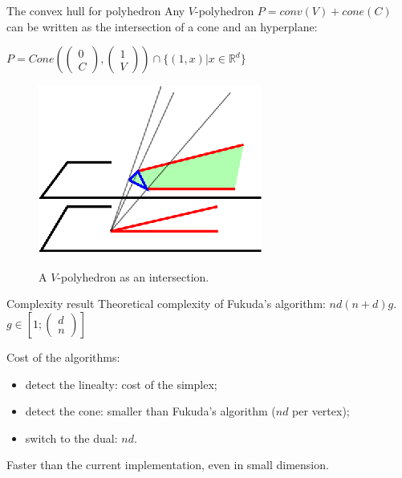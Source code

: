 \begin{frame}{The convex hull for polyhedron}
Any $V$-polyhedron $P=conv(V)+cone(C)$ can be written as the intersection of a cone and an hyperplane:

$P=Cone\left(
 \begin{pmatrix}
 0 \\
 C 
 \end{pmatrix},
 \begin{pmatrix}
 1 \\
 V 
 \end{pmatrix}\right) \cap \{(1,x)|x\in\mathbb{R}^d\}$
 
 
\begin{figure}
\includegraphics[scale=1.5]{images/projection.eps}

A $V$-polyhedron as an intersection.
\end{figure}
\end{frame}

\begin{frame}{Complexity result}
Theoretical complexity of Fukuda's algorithm: $nd(n+d)g$. $g\in \left[1;
\begin{pmatrix}
 d\\
 n 
 \end{pmatrix}\right]$

Cost of the algorithms:
\begin{itemize}
\item detect the linealty: cost of the simplex;
\item detect the cone: smaller than Fukuda's algorithm ($nd$ per vertex);
\item switch to the dual: $nd$.
\end{itemize} 

Faster than the current implementation, even in small dimension.

\end{frame}
